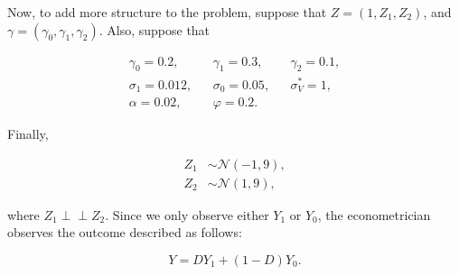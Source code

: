 \documentclass[9pt,twocolumn,twoside,]{pnas-new}
\begin{document}
Now, to add more structure to the problem, suppose that
\(Z = (1, Z_1, Z_2)\), and \(\gamma = (\gamma_0, \gamma_1, \gamma_2)\).
Also, suppose that

\begin{align*}
\gamma_0 = 0.2, && \gamma_1 = 0.3, && \gamma_2 = 0.1, \\
\sigma_1 = 0.012, && \sigma_0 = 0.05, && \sigma^*_V = 1, \\
\alpha = 0.02, && \varphi = 0.2.
\end{align*}

Finally,

\begin{align*}
Z_1 &\sim \mathcal{N}(-1, 9), \\
Z_2 &\sim \mathcal{N} (1, 9),
\end{align*}

where \(Z_1 \perp\!\!\!\!\perp Z_2\). Since we only observe either
\(Y_1\) or \(Y_0\), the econometrician observes the outcome described as
follows:

\[
Y = DY_1 + (1 - D)Y_0.
\]

\newpage
\end{document}
